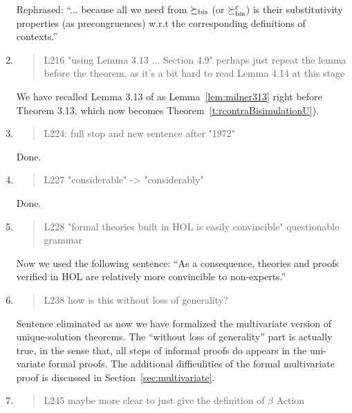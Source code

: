 \begin{enumerate}
  Rephrased: ``... because all we need from $\mathrel{\succeq_{\rm{bis}}}$ (or
$\mathrel{\succeq^{\rm{c}}_{\rm{bis}}}$) is their substitutivity properties (as precongruences)
w.r.t the corresponding definitions of contexts.''

\item \begin{quote}
    L216 "using Lemma 3.13 ... Section 4.9" perhaps just repeat the lemma before the theorem, as it's a bit hard to read Lemma 4.14 at this stage 
  \end{quote}

  We have recalled Lemma 3.13 of \cite{Mil89} as
  Lemma~\ref{lem:milner313} right before Theorem 3.13, which now becomes Theorem~\ref{t:rcontraBisimulationU}).

\item \begin{quote}
    L224: full stop and new sentence after "1972"
  \end{quote}
  Done.
  
\item \begin{quote}
    L227 "considerable" -> "considerably"
  \end{quote}
  Done.
  
\item \begin{quote}
    L228 "formal theories built in HOL is easily convincible" questionable grammar
  \end{quote}

  Now we used the following sentence: ``As a consequence, theories and proofs verified in HOL are relatively more
  convincible to non-experts.''
  
\item \begin{quote}
    L238 how is this without loss of generality?
  \end{quote}

  Sentence eliminated as now we have formalized the multivariate
  version of unique-solution theorems. The ``without loss of
  generality'' part is actually true, in the sense that, all steps of
  informal proofs do appears in the uni-variate formal proofs. The
  additional difficulities of the formal multivariate proof is discussed in Section~\ref{sec:multivariate}.
  
\item \begin{quote}
    L245 maybe more clear to just give the definition of $\beta$ Action 
  \end{quote}


\end{enumerate}
